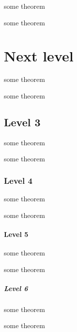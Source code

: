 \begin{Theorem}
some theorem
\end{Theorem}

\begin{Theorem}
some theorem
\end{Theorem}

\hypertarget{next-level}{%
\section{Next level}\label{next-level}}

\begin{Theorem}
some theorem
\end{Theorem}

\begin{Theorem}
some theorem
\end{Theorem}

\hypertarget{level-3}{%
\subsection{Level 3}\label{level-3}}

\begin{Theorem}
some theorem
\end{Theorem}

\begin{Theorem}
some theorem
\end{Theorem}

\hypertarget{level-4}{%
\subsubsection{Level 4}\label{level-4}}

\begin{Theorem}
some theorem
\end{Theorem}

\begin{Theorem}
some theorem
\end{Theorem}

\hypertarget{level-5}{%
\paragraph{Level 5}\label{level-5}}

\begin{Theorem}
some theorem
\end{Theorem}

\begin{Theorem}
some theorem
\end{Theorem}

\hypertarget{level-6}{%
\subparagraph{Level 6}\label{level-6}}

\begin{Theorem}
some theorem
\end{Theorem}

\begin{Theorem}
some theorem
\end{Theorem}

